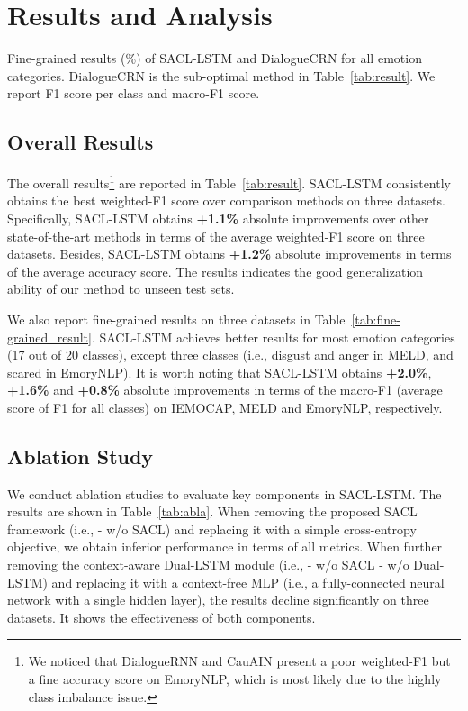 \documentclass[11pt]{article}
\begin{document}
\section{Results and Analysis} \label{sec:sec:exp}
\begin{table}[t]
\centering
\subtable[{IEMOCAP}]{
\resizebox{\linewidth}{!}{^*^*^*^*^*^*^*}
\label{tab:subtab11}
}
\subtable[MELD]{
\resizebox{\linewidth}{!}{^*^*^*^*^*^*}
\label{tab:subtab12}
}
\subtable[EmoryNLP]{
\resizebox{\linewidth}{!}{^*^*^*^*^*^*}
\label{tab:subtab13}
}
\caption{Fine-grained results (\%) of SACL-LSTM and DialogueCRN for all emotion categories. DialogueCRN is the sub-optimal method in Table~\ref{tab:result}. We report F1 score per class and macro-F1 score.}
\label{tab:fine-grained_result}
\end{table}




\subsection{Overall Results}
The overall results\footnote{We noticed that DialogueRNN and CauAIN present a poor weighted-F1 but a fine accuracy score on EmoryNLP, which is most likely due to the highly class imbalance issue.} are reported in Table~\ref{tab:result}. 
SACL-LSTM consistently obtains the best weighted-F1 score over comparison methods on three datasets.
Specifically, SACL-LSTM obtains \textbf{+1.1\%} absolute improvements over other state-of-the-art methods in terms of the average weighted-F1 score on three datasets. 
Besides, SACL-LSTM obtains \textbf{+1.2\%} absolute improvements in terms of the average accuracy score.
The results indicates the good generalization ability of our method to unseen test sets.





We also report fine-grained results on three datasets in Table~\ref{tab:fine-grained_result}. 
SACL-LSTM achieves better results for most emotion categories (17 out of 20 classes), except three classes (i.e., disgust and anger in MELD, and scared in EmoryNLP). 
It is worth noting that SACL-LSTM obtains \textbf{+2.0\%}, \textbf{+1.6\%} and \textbf{+0.8\%} absolute improvements in terms of the macro-F1 (average score of F1 for all classes) on IEMOCAP, MELD and EmoryNLP, respectively.

\subsection{Ablation Study}
We conduct ablation studies to evaluate key components in SACL-LSTM. 
The results are shown in Table~\ref{tab:abla}.
When removing the proposed SACL framework (i.e., {- w/o SACL}) 
and replacing it with a simple cross-entropy objective, we obtain inferior performance in terms of all metrics. 
When further removing the context-aware Dual-LSTM module (i.e., {- w/o SACL - w/o Dual-LSTM}) and replacing it with a context-free MLP (i.e., a fully-connected neural network with a single hidden layer), the results decline significantly on three datasets. 
It shows the effectiveness of both components.
\end{document}
